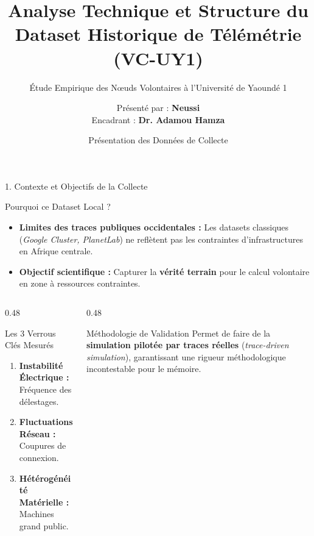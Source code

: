 \documentclass[10pt,aspectratio=169]{beamer}
\title[Présentation du Dataset VC-UY1]{Analyse Technique et Structure du Dataset Historique de Télémétrie (VC-UY1)}
\subtitle{Étude Empirique des Nœuds Volontaires à l'Université de Yaoundé 1}
\author[Mémoire de Master 2]{Présenté par : \textbf{Neussi} \\[0.5em] \small Encadrant : \textbf{Dr. Adamou Hamza}}
\institute[UY1]{Université de Yaoundé I \\ Département d'Informatique \\ Spécialité : Systèmes et Réseaux}
\date[Mai 2026]{Présentation des Données de Collecte}
\begin{document}
\begin{frame}
  \titlepage
\end{frame}

\begin{frame}{1. Contexte et Objectifs de la Collecte}
  \begin{block}{Pourquoi ce Dataset Local ?}
    \begin{itemize}
      \item \textbf{Limites des traces publiques occidentales :} Les datasets classiques (\textit{Google Cluster, PlanetLab}) ne reflètent pas les contraintes d'infrastructures en Afrique centrale.
      \item \textbf{Objectif scientifique :} Capturer la \textbf{vérité terrain} pour le calcul volontaire en zone à ressources contraintes.
    \end{itemize}
  \end{block}
  
  \begin{columns}[T]
    \begin{column}{0.48\textwidth}
      \begin{alertblock}{Les 3 Verrous Clés Mesurés}
        \begin{enumerate}
          \item \textbf{Instabilité Électrique :} Fréquence des délestages.
          \item \textbf{Fluctuations Réseau :} Coupures de connexion.
          \item \textbf{Hétérogénéité Matérielle :} Machines grand public.
        \end{enumerate}
      \end{alertblock}
    \end{column}
    
    \begin{column}{0.48\textwidth}
      \begin{exampleblock}{Méthodologie de Validation}
        Permet de faire de la \textbf{simulation pilotée par traces réelles} (\textit{trace-driven simulation}), garantissant une rigueur méthodologique incontestable pour le mémoire.
      \end{exampleblock}
    \end{column}
  \end{columns}
\end{frame}
\end{document}

